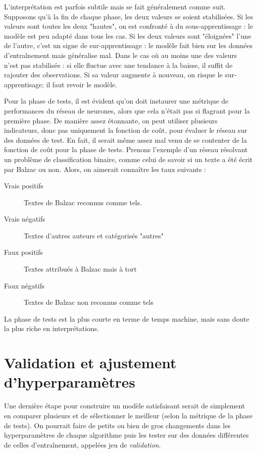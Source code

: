 L'interprétation est parfois subtile mais se fait généralement comme suit. Supposons qu'à la fin de chaque phase, les deux valeurs se soient stabilisées. Si les valeurs sont toutes les deux "hautes", on est confronté à du sous-apprentissage : le modèle est peu adapté dans tous les cas. Si les deux valeurs sont "éloignées" l'une de l'autre, c'est un signe de sur-apprentissage : le modèle fait bien sur les données d'entraînement mais généralise mal.
Dans le cas où au moins une des valeurs n'est pas stabilisée : si elle fluctue avec une tendance à la baisse, il suffit de rajouter des observations. Si sa valeur augmente à nouveau, on risque le sur-apprentisage; il faut revoir le modèle.

Pour la phase de tests, il est évident qu'on doit instaurer une métrique de performances du réseau de neurones, alors que cela n'était pas si flagrant pour la première phase. De manière assez étonnante, on peut utiliser plusieurs indicateurs, donc pas uniquement la fonction de coût, pour évaluer le réseau sur des données de test. En fait, il serait même assez mal venu de se contenter de la fonction de coût pour la phase de tests. Prenons l'exemple d'un réseau résolvant un problème de classification binaire, comme celui de savoir si un texte a été écrit par Balzac ou non. Alors, on aimerait connaître les taux suivants :

\begin{description}
\item[Vrais positifs] Textes de Balzac reconnus comme tels.
\item[Vrais négatifs] Textes d'autres auteurs et catégorisés "autres"
\item[Faux positifs] Textes attribués à Balzac mais à tort
\item[Faux négatifs] Textes de Balzac non reconnus comme tels
\end{description}

La phase de tests est la plus courte en terme de temps machine, mais sans doute la plus riche en interprétations.

\section{Validation et ajustement d'hyperparamètres}
Une dernière étape pour construire un modèle satisfaisant serait de simplement en comparer plusieurs et de sélectionner le meilleur (selon la métrique de la phase de tests). On pourrait faire de petits ou bien de gros changements dans les hyperparamètres de chaque algorithme puis les tester sur des données différentes de celles d'entraînement, appelées jeu de \emph{validation}.

